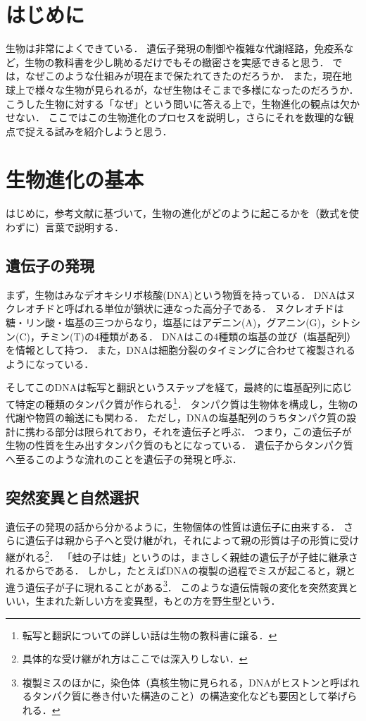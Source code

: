 \section{はじめに}

生物は非常によくできている．
遺伝子発現の制御や複雑な代謝経路，免疫系など，生物の教科書を少し眺めるだけでもその緻密さを実感できると思う．
では，なぜこのような仕組みが現在まで保たれてきたのだろうか．
また，現在地球上で様々な生物が見られるが，なぜ生物はそこまで多様になったのだろうか．
こうした生物に対する「なぜ」という問いに答える上で，生物進化の観点は欠かせない．
ここではこの生物進化のプロセスを説明し，さらにそれを数理的な観点で捉える試みを紹介しようと思う．

\section{生物進化の基本}
はじめに，参考文献\cite{text}に基づいて，生物の進化がどのように起こるかを（数式を使わずに）言葉で説明する．

\subsection{遺伝子の発現}
まず，生物はみなデオキシリボ核酸(DNA)という物質を持っている．
DNAはヌクレオチドと呼ばれる単位が鎖状に連なった高分子である．
ヌクレオチドは糖・リン酸・塩基の三つからなり，塩基にはアデニン(A)，グアニン(G)，シトシン(C)，チミン(T)の4種類がある．
DNAはこの4種類の塩基の並び（塩基配列）を情報として持つ．
また，DNAは細胞分裂のタイミングに合わせて複製されるようになっている．

そしてこのDNAは転写と翻訳というステップを経て，最終的に塩基配列に応じて特定の種類のタンパク質が作られる\footnote{転写と翻訳についての詳しい話は生物の教科書に譲る．}．
タンパク質は生物体を構成し，生物の代謝や物質の輸送にも関わる．
ただし，DNAの塩基配列のうちタンパク質の設計に携わる部分は限られており，それを遺伝子と呼ぶ．
つまり，この遺伝子が生物の性質を生み出すタンパク質のもとになっている．
遺伝子からタンパク質へ至るこのような流れのことを遺伝子の発現と呼ぶ．

\subsection{突然変異と自然選択}
遺伝子の発現の話から分かるように，生物個体の性質は遺伝子に由来する．
さらに遺伝子は親から子へと受け継がれ，それによって親の形質は子の形質に受け継がれる\footnote{具体的な受け継がれ方はここでは深入りしない．}．
「蛙の子は蛙」というのは，まさしく親蛙の遺伝子が子蛙に継承されるからである．
しかし，たとえばDNAの複製の過程でミスが起こると，親と違う遺伝子が子に現れることがある\footnote{複製ミスのほかに，染色体（真核生物に見られる，DNAがヒストンと呼ばれるタンパク質に巻き付いた構造のこと）の構造変化なども要因として挙げられる．}．
このような遺伝情報の変化を突然変異といい，生まれた新しい方を変異型，もとの方を野生型という．

